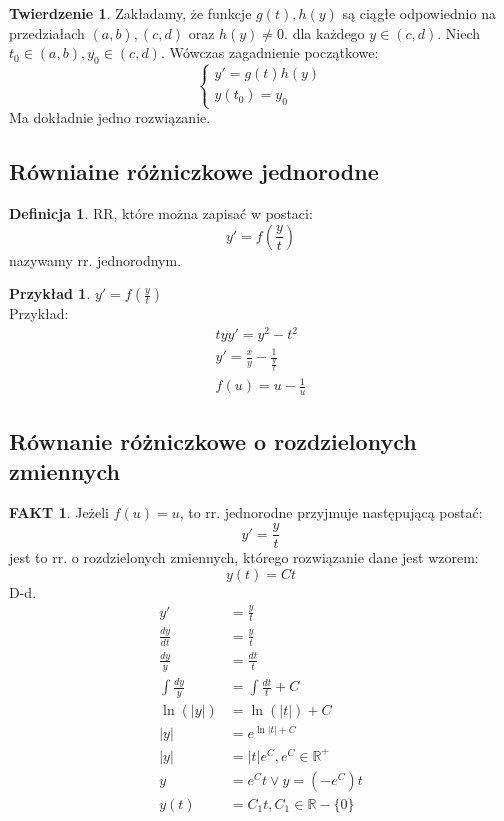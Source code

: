 \documentclass{article}
\theoremstyle{definition}
\newtheorem{de}{Definicja}[subsection]
\theoremstyle{definition}
\newtheorem{tw}{Twierdzenie}[subsection]
\theoremstyle{definition}
\newtheorem{pk}{Przykład}[subsection]
\theoremstyle{definition}
\theoremstyle{definition}
\theoremstyle{definition}
\theoremstyle{definition}
\newtheorem*{fakt}{FAKT}
\begin{document}
\begin{tw}
    Zakładamy, że funkcje $g(t), h(y)$ są ciągłe odpowiednio na przedziałach $(a,b), (c,d)$ oraz $h(y)\neq 0$.
    dla każdego $y\in(c,d)$. Niech $t_0\in(a,b), y_0\in(c,d)$. Wówczas zagadnienie początkowe:
    $$
    \begin{cases}
        y' = g(t)h(y)\\
        y(t_0) = y_0
    \end{cases}
    $$
    Ma dokładnie jedno rozwiązanie.
\end{tw}

\subsection{Równiaine różniczkowe jednorodne}

\begin{de}
    RR, które można zapisać w postaci:
    \[y' = f\left(\frac{y}{t}\right)\]
    nazywamy rr. jednorodnym.
\end{de}

\begin{pk}
    $y'=f\left(\frac{y}{t}\right)$\\
    Przykład:\\
    \begin{align}
        ty y' = y^2 - t^2\\
        y' = \frac{x}{y} - \frac{1}{\frac{y}{t}}\\
        f(u)=u-\frac{1}{u}
    \end{align}
\end{pk}

\subsection{Równanie różniczkowe o rozdzielonych zmiennych}

\begin{fakt}
    Jeżeli $f(u)=u$, to rr. jednorodne przyjmuje następującą postać:
    \[y' = \frac{y}{t}\]
    jest to rr. o rozdzielonych zmiennych, którego rozwiązanie dane jest wzorem:
    \[y(t)=Ct\]
    D-d.\\
    \begin{align}
        y' &= \frac{y}{t}\\
        \frac{dy}{dt} &= \frac{y}{t}\\
        \frac{dy}{y} &= \frac{dt}{t}\\
        \int \frac{dy}{y} &= \int \frac{dt}{t} + C\\
        \ln(|y|) &= \ln(|t|) + C\\
        |y| &= e^{\ln|t| + C}\\
        |y| &= |t|e^{C}, e^{C} \in \mathbb{R^{+}}\\
        y &= e^{C}t \lor y=(-e^{C}) t\\
        y(t) &= C_1 t, C_1 \in \mathbb{R}-\{0\}
    \end{align}
\end{fakt}
\end{document}
